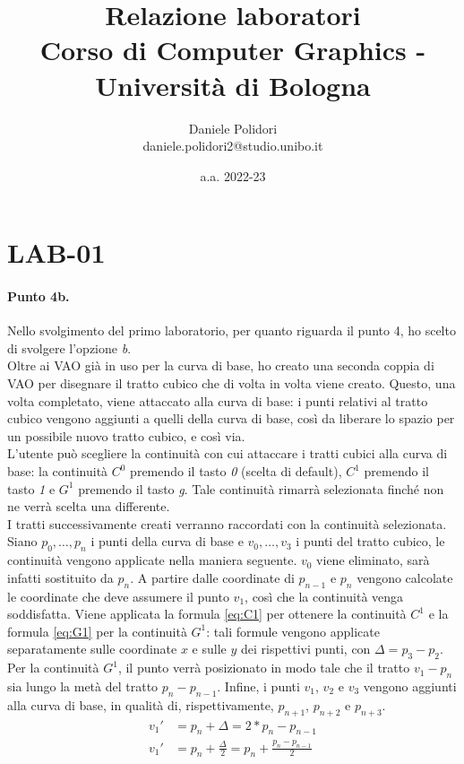 \documentclass[a4paper, 12pt]{article}
\title{\textbf{Relazione laboratori}\\
        \normalsize Corso di Computer Graphics - Università di Bologna}
\author{Daniele Polidori\\ daniele.polidori2@studio.unibo.it}
\date{a.a. 2022-23}
\begin{document}
\maketitle



\section{LAB-01}

\paragraph{Punto 4b.}
Nello svolgimento del primo laboratorio, per quanto riguarda il punto 4, ho scelto di svolgere l'opzione \textit{b}.\\
Oltre ai VAO già in uso per la curva di base, ho creato una seconda coppia di VAO per disegnare il tratto cubico che di volta in volta viene creato. Questo, una volta completato, viene attaccato alla curva di base: i punti relativi al tratto cubico vengono aggiunti a quelli della curva di base, così da liberare lo spazio per un possibile nuovo tratto cubico, e così via.\\
L'utente può scegliere la continuità con cui attaccare i tratti cubici alla curva di base: la continuità $C^0$ premendo il tasto \textit{0} (scelta di default), $C^1$ premendo il tasto \textit{1} e $G^1$ premendo il tasto \textit{g}. Tale continuità rimarrà selezionata finché non ne verrà scelta una differente.\\
I tratti successivamente creati verranno raccordati con la continuità selezionata. Siano $p_0, \dots, p_n$ i punti della curva di base e $v_0, \dots, v_3$ i punti del tratto cubico, le continuità vengono applicate nella maniera seguente. $v_0$ viene eliminato, sarà infatti sostituito da $p_n$. A partire dalle coordinate di $p_{n-1}$ e $p_n$ vengono calcolate le coordinate che deve assumere il punto $v_1$, così che la continuità venga soddisfatta. Viene applicata la formula \eqref{eq:C1} per ottenere la continuità $C^1$ e la formula \eqref{eq:G1} per la continuità $G^1$: tali formule vengono applicate separatamente sulle coordinate $x$ e sulle $y$ dei rispettivi punti, con $\Delta = p_3 - p_2$. Per la continuità $G^1$, il punto verrà posizionato in modo tale che il tratto $v_1 - p_n$ sia lungo la metà del tratto $p_n - p_{n-1}$. Infine, i punti $v_1$, $v_2$ e $v_3$ vengono aggiunti alla curva di base, in qualità di, rispettivamente, $p_{n+1}$, $p_{n+2}$ e $p_{n+3}$.
\begin{align}
  v_1' &= p_n + \Delta = 2*p_n - p_{n-1}             \label{eq:C1} \\
  v_1' &= p_n + \frac{\Delta}{2} = p_n + \frac{p_n - p_{n-1}}{2}   \label{eq:G1}
\end{align}
\end{document}
